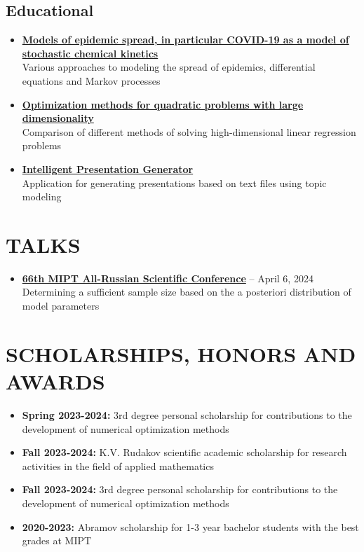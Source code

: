 \documentclass[12pt]{moderncv}
\begin{document}
        \subsection{Educational}

        \begin{itemize}
            \item \href{https://github.com/kisnikser/Epidemic-Spread-Models}{\textbf{Models of epidemic spread, in particular COVID-19 as a model of stochastic chemical kinetics}}\\
            Various approaches to modeling the spread of epidemics, differential equations and Markov processes
            \item \href{https://github.com/kisnikser/Optimization-Methods}{\textbf{Optimization methods for quadratic problems with large dimensionality}}\\
            Comparison of different methods of solving high-dimensional linear regression problems
            \item \href{https://github.com/kisnikser/Intelligent-Presentation-Generator}{\textbf{Intelligent Presentation Generator}}\\
            Application for generating presentations based on text files using topic modeling
        \end{itemize}

    \section{TALKS}

        \begin{itemize}
            \item \href{https://www.youtube.com/live/WnIRaRl730A?si=q0eScgnDP2ZidCpK&t=1723}{\textbf{66th MIPT All-Russian Scientific Conference}} -- April 6, 2024\\
            Determining a sufficient sample size based on the a posteriori distribution of model parameters
        \end{itemize}

    \section{SCHOLARSHIPS, HONORS AND AWARDS}

        \begin{itemize}
            \item \textbf{Spring 2023-2024:} 3rd degree personal scholarship for contributions to the development of numerical optimization methods
            \item \textbf{Fall 2023-2024:} K.V. Rudakov scientific academic scholarship for research activities in the field of applied mathematics
            \item \textbf{Fall 2023-2024:} 3rd degree personal scholarship for contributions to the development of numerical optimization methods
            \item \textbf{2020-2023:} Abramov scholarship for 1-3 year bachelor students with the best grades at MIPT
        \end{itemize}
\end{document}
